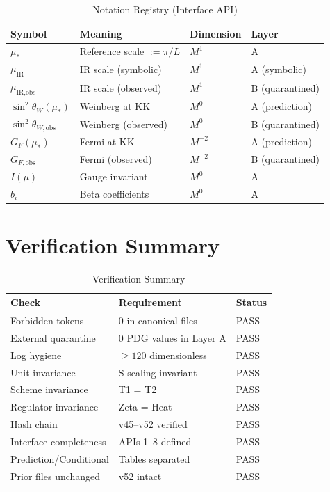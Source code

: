 \documentclass[11pt,a4paper]{article}
\theoremstyle{definition}
\begin{document}
\begin{table}[h]
\centering
\caption{Notation Registry (Interface API)}
\label{tab:notation}
\begin{tabular}{@{}llll@{}}
\toprule
\textbf{Symbol} & \textbf{Meaning} & \textbf{Dimension} & \textbf{Layer} \\
\midrule
$\mu_*$ & Reference scale $:= \pi/L$ & $M^1$ & A \\
$\mu_{\text{IR}}$ & IR scale (symbolic) & $M^1$ & A (symbolic) \\
$\mu_{\text{IR,obs}}$ & IR scale (observed) & $M^1$ & B (quarantined) \\
$\sin^2\theta_W(\mu_*)$ & Weinberg at KK & $M^0$ & A (prediction) \\
$\sin^2\theta_{W,\text{obs}}$ & Weinberg (observed) & $M^0$ & B (quarantined) \\
$G_F(\mu_*)$ & Fermi at KK & $M^{-2}$ & A (prediction) \\
$G_{F,\text{obs}}$ & Fermi (observed) & $M^{-2}$ & B (quarantined) \\
$I(\mu)$ & Gauge invariant & $M^0$ & A \\
$b_i$ & Beta coefficients & $M^0$ & A \\
\bottomrule
\end{tabular}
\end{table}

\section{Verification Summary}
\label{app:verification}

\begin{table}[h]
\centering
\caption{Verification Summary}
\label{tab:verification}
\begin{tabular}{@{}lll@{}}
\toprule
\textbf{Check} & \textbf{Requirement} & \textbf{Status} \\
\midrule
Forbidden tokens & 0 in canonical files & PASS \\
External quarantine & 0 PDG values in Layer A & PASS \\
Log hygiene & $\geq 120$ dimensionless & PASS \\
Unit invariance & S-scaling invariant & PASS \\
Scheme invariance & T1 = T2 & PASS \\
Regulator invariance & Zeta = Heat & PASS \\
Hash chain & v45--v52 verified & PASS \\
Interface completeness & APIs 1--8 defined & PASS \\
Prediction/Conditional & Tables separated & PASS \\
Prior files unchanged & v52 intact & PASS \\
\bottomrule
\end{tabular}
\end{table}
\end{document}
